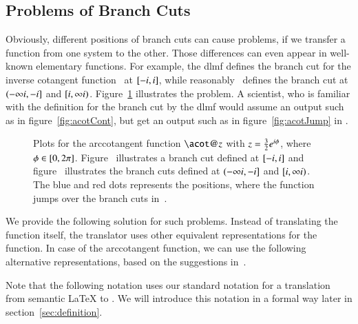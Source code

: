 \subsection{Problems of Branch Cuts}\label{subsec:branch-cut-issues}
Obviously, different positions of branch cuts can cause problems, if we transfer a function from one system to the other. Those differences can even appear in well-known elementary functions. For example, the \gls{dlmf} defines the branch cut for the inverse cotangent function~\parencite[(4.23.9)]{NIST:DLMF} at $[-{i}, {i}]$, while \Maple{} reasonably~\parencite{Branches:acot} defines the branch cut at $(-\infty{i}, -{i}]$ and $[{i}, \infty{i})$. Figure~\ref{fig:acot} illustrates the problem. A scientist, who is familiar with the definition for the branch cut by the \gls{dlmf} would assume an output such as in figure~\ref{fig:acotCont}, but get an output such as in figure~\ref{fig:acotJump} in \Maple.

\begin{figure}[!ht]
    \centering
    \hspace{0.2cm}
    \caption{Plots for the arccotangent function $\acot@{z}$ with $z = \frac{3}{2}{e}^{{i}\phi}$, where $\phi \in [0,2{\pi}]$. Figure~\protect{} illustrates a branch cut defined at $[-{i}, {i}]$ and figure~\protect{} illustrates the branch cuts defined at $(-\infty{i}, -{i}]$ and $[{i}, \infty{i})$. The blue and red dots represents the positions, where the function jumps over the branch cuts in~\protect{}.}
    \label{fig:acot}
\end{figure}

We provide the following solution for such problems. Instead of translating the function itself, the translator uses other equivalent representations for the function. In case of the arccotangent function, we can use the following alternative representations, based on the suggestions in~\parencite{Branches:acot}.

Note that the following notation uses our standard notation for a translation from semantic \LaTeX{} to \Maple. We will introduce this notation in a formal way later in section~\ref{sec:definition}.

